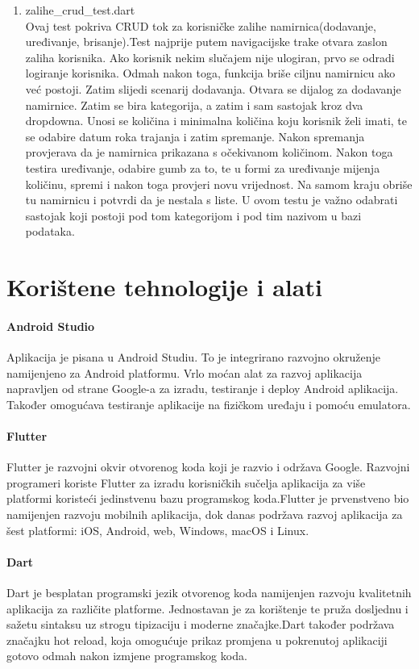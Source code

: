 \documentclass[diplomskirad]{fer}
\begin{document}
\begin{enumerate}
    \item zalihe\_crud\_test.dart
    \\
    Ovaj test pokriva CRUD tok za korisničke zalihe namirnica(dodavanje, uređivanje, brisanje).Test najprije putem navigacijske trake otvara zaslon zaliha korisnika. Ako korisnik nekim slučajem nije ulogiran, prvo se odradi logiranje korisnika. Odmah nakon toga, funkcija briše ciljnu namirnicu ako već postoji. Zatim slijedi scenarij dodavanja. Otvara se dijalog za dodavanje namirnice. Zatim se bira kategorija, a zatim i sam sastojak kroz dva dropdowna. Unosi se količina i minimalna količina koju korisnik želi imati, te se odabire datum roka trajanja i zatim spremanje. Nakon spremanja provjerava da je namirnica prikazana s očekivanom količinom. Nakon toga testira uređivanje, odabire gumb za to, te u formi za uređivanje mijenja količinu, spremi i nakon toga provjeri novu vrijednost. Na samom kraju obriše tu namirnicu i potvrdi da je nestala s liste. U ovom testu je važno odabrati sastojak koji postoji pod tom kategorijom i pod tim nazivom u bazi podataka.
\end{enumerate}



\chapter{Korištene tehnologije i alati}
\subsubsection{Android Studio} 
Aplikacija je pisana u Android Studiu. To je integrirano razvojno okruženje namijenjeno za Android platformu. Vrlo moćan alat za razvoj aplikacija napravljen od strane Google-a za izradu, testiranje i deploy Android aplikacija. Također omogućava testiranje aplikacije na fizičkom uređaju i pomoću emulatora. \cite{AndroidStudio}
\subsubsection{Flutter}
Flutter je razvojni okvir otvorenog koda koji je razvio i održava Google. Razvojni programeri koriste Flutter za izradu korisničkih sučelja aplikacija za više platformi koristeći jedinstvenu bazu programskog koda.Flutter je prvenstveno bio namijenjen razvoju mobilnih aplikacija, dok danas podržava razvoj aplikacija za šest platformi: iOS, Android, web, Windows, macOS i Linux. \cite{Flutter}
\subsubsection{Dart}
Dart je besplatan programski jezik otvorenog koda namijenjen razvoju kvalitetnih aplikacija za različite platforme. Jednostavan je za korištenje te pruža dosljednu i sažetu sintaksu uz strogu tipizaciju i moderne značajke.Dart također podržava značajku hot reload, koja omogućuje prikaz promjena u pokrenutoj aplikaciji gotovo odmah nakon izmjene programskog koda.
\cite{Dart}
\end{document}
